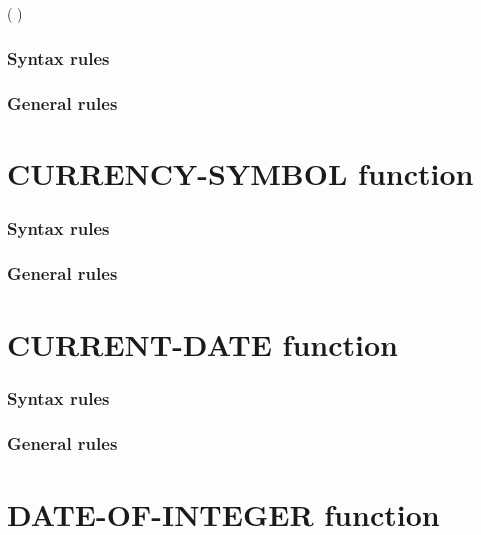 \begin{syntax}
    ( \argument )
\end{syntax}

\subsubsection{Syntax rules}

\subsubsection{General rules}

\section{CURRENCY-SYMBOL function}

\begin{syntax}[\gnucobolcolour]
   
\end{syntax}

\subsubsection{Syntax rules}

\subsubsection{General rules}

\section{CURRENT-DATE function}

\begin{syntax}
   
\end{syntax}

\subsubsection{Syntax rules}

\subsubsection{General rules}

\section{DATE-OF-INTEGER function}

